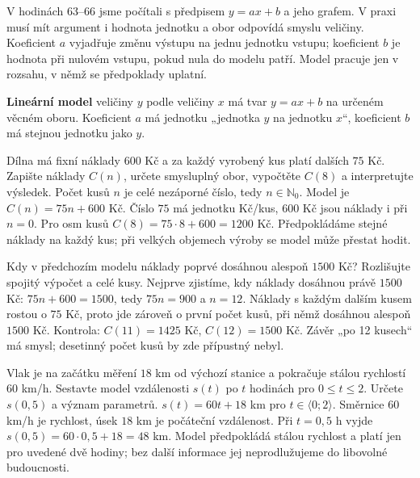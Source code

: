 \documentclass[11pt,a4paper]{article}
\begin{document}
V hodinách 63–66 jsme počítali s předpisem $y=ax+b$ a jeho grafem. V praxi musí mít argument i hodnota jednotku a obor odpovídá smyslu veličiny. Koeficient $a$ vyjadřuje změnu výstupu na jednu jednotku vstupu; koeficient $b$ je hodnota při nulovém vstupu, pokud nula do modelu patří. Model pracuje jen v rozsahu, v němž se předpoklady uplatní.
\begin{definiceBox}
\textbf{Lineární model} veličiny $y$ podle veličiny $x$ má tvar $y=ax+b$ na určeném věcném oboru. Koeficient $a$ má jednotku „jednotka $y$ na jednotku $x$“, koeficient $b$ má stejnou jednotku jako $y$.
\end{definiceBox}
\begin{prikladReseniBox}
Dílna má fixní náklady $600$ Kč a za každý vyrobený kus platí dalších $75$ Kč. Zapište náklady $C(n)$, určete smysluplný obor, vypočtěte $C(8)$ a interpretujte výsledek.
\tcblower
Počet kusů $n$ je celé nezáporné číslo, tedy $n\in\mathbb N_0$. Model je $C(n)=75n+600$ Kč. Číslo $75$ má jednotku Kč/kus, $600$ Kč jsou náklady i při $n=0$. Pro osm kusů $C(8)=75\cdot8+600=1200$ Kč. Předpokládáme stejné náklady na každý kus; při velkých objemech výroby se model může přestat hodit.
\end{prikladReseniBox}
\begin{prikladReseniBox}
Kdy v předchozím modelu náklady poprvé dosáhnou alespoň $1500$ Kč? Rozlišujte spojitý výpočet a celé kusy.
\tcblower
Nejprve zjistíme, kdy náklady dosáhnou právě $1500$ Kč: $75n+600=1500$, tedy $75n=900$ a $n=12$. Náklady s každým dalším kusem rostou o $75$ Kč, proto jde zároveň o první počet kusů, při němž dosáhnou alespoň $1500$ Kč. Kontrola: $C(11)=1425$ Kč, $C(12)=1500$ Kč. Závěr „po 12 kusech“ má smysl; desetinný počet kusů by zde přípustný nebyl.
\end{prikladReseniBox}
\begin{prikladReseniBox}
Vlak je na začátku měření $18$ km od výchozí stanice a pokračuje stálou rychlostí $60$ km/h. Sestavte model vzdálenosti $s(t)$ po $t$ hodinách pro $0\le t\le2$. Určete $s(0{,}5)$ a význam parametrů.
\tcblower
$s(t)=60t+18$ km pro $t\in\langle0;2\rangle$. Směrnice $60$ km/h je rychlost, úsek $18$ km je počáteční vzdálenost. Při $t=0{,}5$ h vyjde $s(0{,}5)=60\cdot0{,}5+18=48$ km. Model předpokládá stálou rychlost a platí jen pro uvedené dvě hodiny; bez další informace jej neprodlužujeme do libovolné budoucnosti.
\end{prikladReseniBox}
\begin{center}
\end{center}
\end{document}
